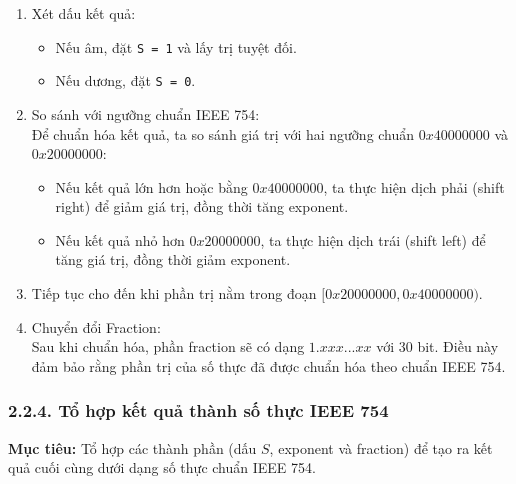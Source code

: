 \begin{enumerate}
    \item Xét dấu kết quả:
    \begin{itemize}
        \item Nếu âm, đặt \texttt{S = 1} và lấy trị tuyệt đối.
        \item Nếu dương, đặt \texttt{S = 0}.
    \end{itemize}
   \item {So sánh với ngưỡng chuẩn IEEE 754:} \\ 
    Để chuẩn hóa kết quả, ta so sánh giá trị với hai ngưỡng chuẩn \( 0x40000000 \) và \( 0x20000000 \):
\begin{itemize}
        \item Nếu kết quả lớn hơn hoặc bằng \( 0x40000000 \), ta thực hiện dịch phải (shift right) để giảm giá trị, đồng thời tăng exponent.
        \item Nếu kết quả nhỏ hơn \( 0x20000000 \), ta thực hiện dịch trái (shift left) để tăng giá trị, đồng thời giảm exponent.
    \end{itemize}
    \item Tiếp tục cho đến khi phần trị nằm trong đoạn $[0x20000000, 0x40000000)$.
     \item Chuyển đổi Fraction:\\  
    Sau khi chuẩn hóa, phần fraction sẽ có dạng \( 1.xxx...xx \) với 30 bit. Điều này đảm bảo rằng phần trị của số thực đã được chuẩn hóa theo chuẩn IEEE 754.
\end{enumerate}

\subsubsection*{2.2.4. Tổ hợp kết quả thành số thực IEEE 754}
\textbf{Mục tiêu:} Tổ hợp các thành phần (dấu \( S \), exponent và fraction) để tạo ra kết quả cuối cùng dưới dạng số thực chuẩn IEEE 754.\\

